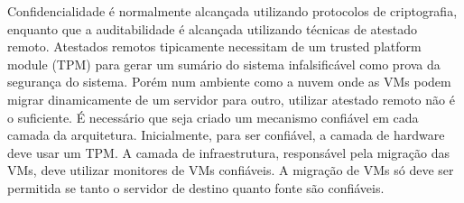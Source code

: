 	Confidencialidade é normalmente alcançada utilizando protocolos de criptografia, enquanto que a auditabilidade é alcançada utilizando técnicas de atestado remoto. Atestados remotos tipicamente necessitam de um trusted platform module (TPM) para gerar um sumário do sistema infalsificável como prova da segurança do sistema. Porém num ambiente como a nuvem onde as VMs podem migrar dinamicamente de um servidor para outro, utilizar atestado remoto não é o suficiente. É necessário que seja criado um mecanismo confiável em cada camada da arquitetura. Inicialmente, para ser confiável, a camada de hardware deve usar um TPM. A camada de infraestrutura, responsável pela migração das VMs, deve utilizar monitores de VMs confiáveis. A migração de VMs só deve ser permitida se tanto o servidor de destino quanto fonte são confiáveis.


